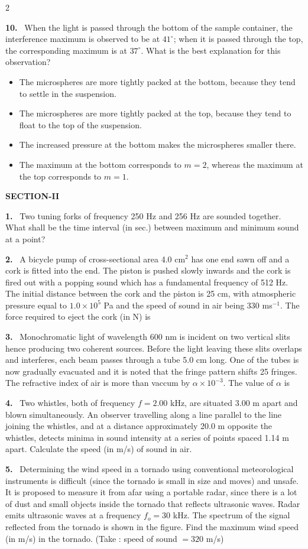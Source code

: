 \documentclass[10pt]{extarticle}
\newcommand{\sect}[1]{\par\smallskip\noindent\textbf{#1}\par}
\newcommand{\qn}[1]{\par\smallskip\noindent\textbf{#1.}~}
\newenvironment{qoptions}{\begin{itemize}[leftmargin=1.8em,itemsep=1pt,topsep=2pt,label={}]}{\end{itemize}}
\newcommand{\opt}[2]{\item[(#1)] #2}
\begin{document}
\begin{multicols}{2}
\begin{qoptions}
\end{qoptions}
\qn{10} When the light is passed through the bottom of the sample container, the interference maximum is observed to be at $41^\circ$; when it is passed through the top, the corresponding maximum is at $37^\circ$. What is the best explanation for this observation?
\begin{qoptions}
\opt{A}{The microspheres are more tightly packed at the bottom, because they tend to settle in the suspension.}
\opt{B}{The microspheres are more tightly packed at the top, because they tend to float to the top of the suspension.}
\opt{C}{The increased pressure at the bottom makes the microspheres smaller there.}
\opt{D}{The maximum at the bottom corresponds to $m=2$, whereas the maximum at the top corresponds to $m=1$.}
\end{qoptions}
\sect{SECTION-II}
\qn{1} Two tuning forks of frequency 250 Hz and 256 Hz are sounded together. What shall be the time interval (in sec.) between maximum and minimum sound at a point?
\qn{2} A bicycle pump of cross-sectional area 4.0 cm$^2$ has one end sawn off and a cork is fitted into the end. The piston is pushed slowly inwards and the cork is fired out with a popping sound which has a fundamental frequency of 512 Hz. The initial distance between the cork and the piston is 25 cm, with atmospheric pressure equal to $1.0\times10^5$ Pa and the speed of sound in air being 330 ms$^{-1}$. The force required to eject the cork (in N) is
\qn{3} Monochromatic light of wavelength 600 nm is incident on two vertical slits hence producing two coherent sources. Before the light leaving these slits overlaps and interferes, each beam passes through a tube 5.0 cm long. One of the tubes is now gradually evacuated and it is noted that the fringe pattern shifts 25 fringes. The refractive index of air is more than vaccum by $\alpha\times10^{-3}$. The value of $\alpha$ is
\qn{4} Two whistles, both of frequency $f=2.00$ kHz, are situated 3.00 m apart and blown simultaneously. An observer travelling along a line parallel to the line joining the whistles, and at a distance approximately 20.0 m opposite the whistles, detects minima in sound intensity at a series of points spaced 1.14 m apart. Calculate the speed (in m/s) of sound in air.
\qn{5} Determining the wind speed in a tornado using conventional meteorological instruments is difficult (since the tornado is small in size and moves) and unsafe. It is proposed to measure it from afar using a portable radar, since there is a lot of dust and small objects inside the tornado that reflects ultrasonic waves. Radar emits ultrasonic waves at a frequency $f_o=30$ kHz. The spectrum of the signal reflected from the tornado is shown in the figure. Find the maximum wind speed (in m/s) in the tornado. (Take : speed of sound $=320$ m/s)

\end{multicols}
\end{document}
